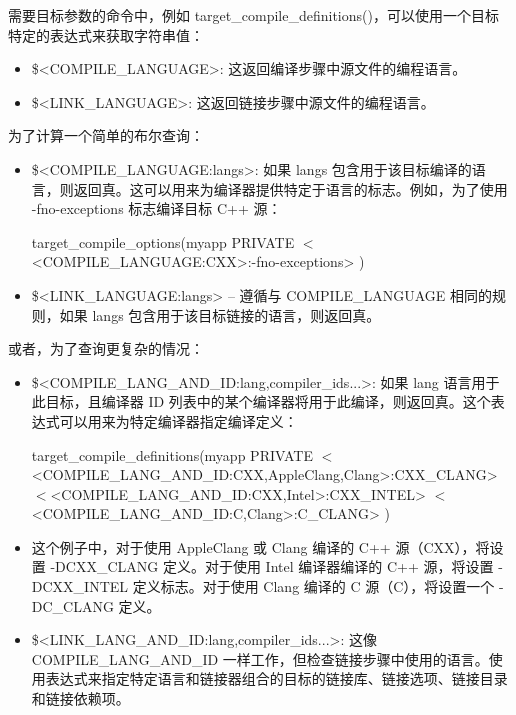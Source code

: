 需要目标参数的命令中，例如 target\_compile\_definitions()，可以使用一个目标特定的表达式来获取字符串值：

\begin{itemize}
\item
\$<COMPILE\_LANGUAGE>: 这返回编译步骤中源文件的编程语言。

\item
\$<LINK\_LANGUAGE>: 这返回链接步骤中源文件的编程语言。
\end{itemize}

为了计算一个简单的布尔查询：

\begin{itemize}
\item
\$<COMPILE\_LANGUAGE:langs>: 如果 langs 包含用于该目标编译的语言，则返回真。这可以用来为编译器提供特定于语言的标志。例如，为了使用 -fno-exceptions 标志编译目标 C++ 源：

\begin{cmake}
target_compile_options(myapp
    PRIVATE $<$<COMPILE_LANGUAGE:CXX>:-fno-exceptions>
)
\end{cmake}

\item
\$<LINK\_LANGUAGE:langs> – 遵循与 COMPILE\_LANGUAGE 相同的规则，如果 langs 包含用于该目标链接的语言，则返回真。
\end{itemize}

或者，为了查询更复杂的情况：

\begin{itemize}
\item
\$<COMPILE\_LANG\_AND\_ID:lang,compiler\_ids...>: 如果 lang 语言用于此目标，且编译器 ID 列表中的某个编译器将用于此编译，则返回真。这个表达式可以用来为特定编译器指定编译定义：

\begin{cmake}
target_compile_definitions(myapp PRIVATE
    $<$<COMPILE_LANG_AND_ID:CXX,AppleClang,Clang>:CXX_CLANG>
    $<$<COMPILE_LANG_AND_ID:CXX,Intel>:CXX_INTEL>
    $<$<COMPILE_LANG_AND_ID:C,Clang>:C_CLANG>
)
\end{cmake}

\item
这个例子中，对于使用 AppleClang 或 Clang 编译的 C++ 源（CXX），将设置 -DCXX\_CLANG 定义。对于使用 Intel 编译器编译的 C++ 源，将设置 -DCXX\_INTEL 定义标志。对于使用 Clang 编译的 C 源（C），将设置一个 -DC\_CLANG 定义。

\item
\$<LINK\_LANG\_AND\_ID:lang,compiler\_ids...>: 这像 COMPILE\_LANG\_AND\_ID 一样工作，但检查链接步骤中使用的语言。使用表达式来指定特定语言和链接器组合的目标的链接库、链接选项、链接目录和链接依赖项。
\end{itemize}

